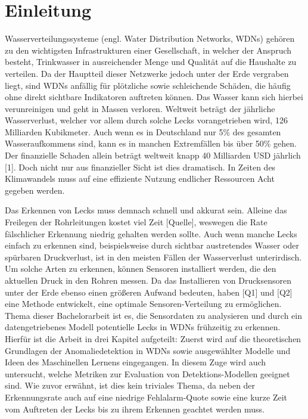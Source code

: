 \chapter{Einleitung}

Wasserverteilungssysteme (engl. Water Distribution Networks, WDNs) gehören zu den wichtigsten Infrastrukturen
 einer Gesellschaft, in welcher der Anspruch besteht, Trinkwasser in ausreichender Menge und Qualität auf die
 Haushalte zu verteilen. Da der Hauptteil dieser Netzwerke jedoch unter der Erde vergraben liegt, sind WDNs
 anfällig für plötzliche sowie schleichende Schäden, die häufig ohne direkt sichtbare Indikatoren
 auftreten können. Das Wasser kann sich hierbei verunreinigen und geht in Massen verloren. Weltweit beträgt
 der jährliche Wasserverlust, welcher vor allem durch solche Lecks vorangetrieben wird, 126 Milliarden
 Kubikmeter. Auch wenn es in Deutschland nur 5\% des gesamten Wasseraufkommens sind, kann es in manchen
 Extremfällen bis über 50\% gehen. Der finanzielle Schaden allein beträgt weltweit knapp 40 Milliarden USD
 jährlich [1]. Doch nicht nur aus finanzieller Sicht ist dies dramatisch. In Zeiten des Klimawandels muss auf
 eine effiziente Nutzung endlicher Ressourcen Acht gegeben werden.


Das Erkennen von Lecks muss demnach schnell und akkurat sein. Alleine das Freilegen der Rohrleitungen kostet viel
 Zeit [Quelle], weswegen die Rate fälschlicher Erkennung niedrig gehalten werden sollte. Auch wenn manche Lecks
 einfach zu erkennen sind, beispielsweise durch sichtbar austretendes Wasser oder spürbaren Druckverlust, ist in
 den meisten Fällen der Wasserverlust unterirdisch. Um solche Arten zu erkennen, können Sensoren installiert
 werden, die den aktuellen Druck in den Rohren messen. Da das Installieren von Drucksensoren unter der Erde
 ebenso einen größeren Aufwand bedeuten, haben [Q1] und [Q2] eine Methode entwickelt, eine optimale
 Sensoren-Verteilung zu ermöglichen.
Thema dieser Bachelorarbeit ist es, die Sensordaten zu analysieren und durch ein datengetriebenes Modell
 potentielle Lecks in WDNs frühzeitig zu erkennen. Hierfür ist die Arbeit in drei Kapitel aufgeteilt:
 Zuerst wird auf die theoretischen Grundlagen der Anomaliedetektion in WDNs sowie ausgewählter Modelle und
 Ideen des Maschinellen Lernens eingegangen.
In diesem Zuge wird auch untersucht, welche Metriken zur Evaluation von Detektions-Modellen geeignet sind.
Wie zuvor erwähnt, ist dies kein triviales Thema, da neben der Erkennungsrate auch auf eine niedrige
 Fehlalarm-Quote sowie eine kurze Zeit vom Auftreten der Lecks bis zu ihrem Erkennen geachtet werden muss.


